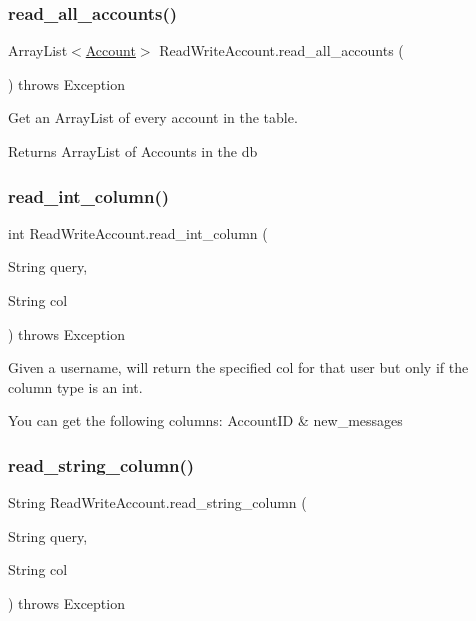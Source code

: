 \subsubsection{\texorpdfstring{read\+\_\+all\+\_\+accounts()}{read\_all\_accounts()}}
{\footnotesize\ttfamily Array\+List$<$\hyperlink{class_account}{Account}$>$ Read\+Write\+Account.\+read\+\_\+all\+\_\+accounts (\begin{DoxyParamCaption}{ }\end{DoxyParamCaption}) throws Exception}



Get an Array\+List of every account in the table. 

\begin{DoxyReturn}{Returns}
Array\+List of Accounts in the db 
\end{DoxyReturn}
\mbox{\label{class_read_write_account_afdac5d7a98c49a6daa71564116d3c49f}} 
\subsubsection{\texorpdfstring{read\+\_\+int\+\_\+column()}{read\_int\_column()}}
{\footnotesize\ttfamily int Read\+Write\+Account.\+read\+\_\+int\+\_\+column (\begin{DoxyParamCaption}\item[{String}]{query,  }\item[{String}]{col }\end{DoxyParamCaption}) throws Exception}



Given a username, will return the specified col for that user but only if the column type is an int. 

You can get the following columns\+: Account\+ID \& new\+\_\+messages \mbox{\label{class_read_write_account_a088ef942f68e5e969c153b241b534ff5}} 
\subsubsection{\texorpdfstring{read\+\_\+string\+\_\+column()}{read\_string\_column()}}
{\footnotesize\ttfamily String Read\+Write\+Account.\+read\+\_\+string\+\_\+column (\begin{DoxyParamCaption}\item[{String}]{query,  }\item[{String}]{col }\end{DoxyParamCaption}) throws Exception}



